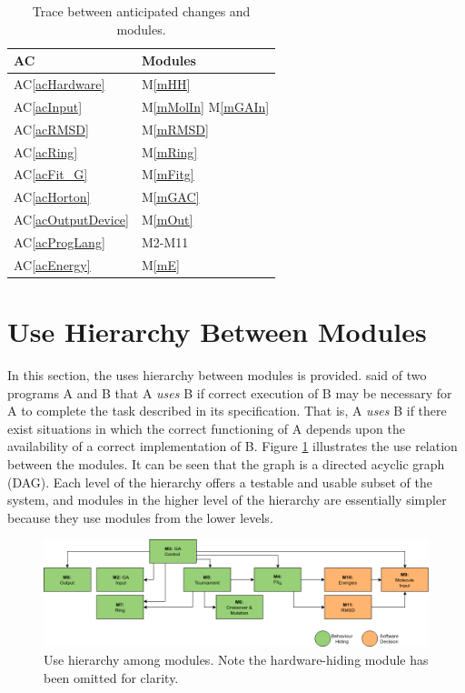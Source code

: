 \documentclass[12pt, titlepage]{article}
\newcommand{\acref}[1]{AC\ref{#1}}
\newcommand{\mref}[1]{M\ref{#1}}
\begin{document}
\begin{table}[H]
\centering
\begin{tabular}{p{} p{}}
\toprule
\textbf{AC} & \textbf{Modules}\\
\midrule
\acref{acHardware} & \mref{mHH}\\
\acref{acInput} & \mref{mMolIn} \mref{mGAIn} \\
\acref{acRMSD} & \mref{mRMSD} \\
\acref{acRing} & \mref{mRing} \\
\acref{acFit_G} & \mref{mFitg} \\
\acref{acHorton} & \mref{mGAC} \\
\acref{acOutputDevice} & \mref{mOut} \\
\acref{acProgLang} & M2-M11 \\
\acref{acEnergy} & \mref{mE} \\
\bottomrule
\end{tabular}
\caption{Trace between anticipated changes and modules.}
\label{trace-ACM}
\end{table}

\section{Use Hierarchy Between Modules} \label{SecUse}

In this section, the uses hierarchy between modules is
provided. \citet{Parnas1978} said of two programs A and B that A {\em uses} B if
correct execution of B may be necessary for A to complete the task described in
its specification. That is, A {\em uses} B if there exist situations in which
the correct functioning of A depends upon the availability of a correct
implementation of B.  Figure \ref{FigUH} illustrates the use relation between
the modules. It can be seen that the graph is a directed acyclic graph
(DAG). Each level of the hierarchy offers a testable and usable subset of the
system, and modules in the higher level of the hierarchy are essentially simpler
because they use modules from the lower levels.

\begin{figure}[H]
\centering
\includegraphics[width=\textwidth]{MG_hierarchy_draft4.png}
\caption{Use hierarchy among modules. Note the hardware-hiding module has been 
omitted for clarity.}
\label{FigUH}
\end{figure}
\end{document}
